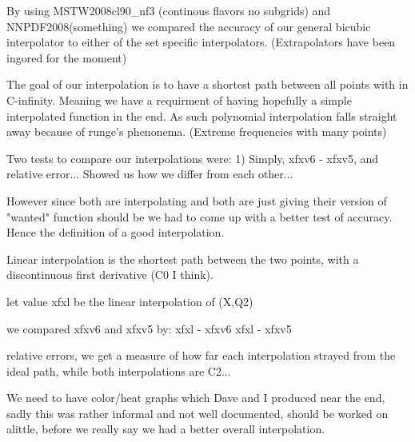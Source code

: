 By using MSTW2008cl90_nf3 (continous flavors no subgrids) and NNPDF2008(something)
we compared the accuracy of our general bicubic interpolator to either 
of the set specific interpolators. (Extrapolators have been ingored 
for the moment)

The goal of our interpolation is to have a shortest path between all 
points with in C-infinity. Meaning we have a requirment of having 
hopefully a simple interpolated function in the end. As such polynomial 
interpolation falls straight away because of runge's phenonema. 
(Extreme frequencies with many points)

Two tests to compare our interpolations were:
1) Simply, xfxv6 - xfxv5, and relative error... Showed us how we 
differ from each other...

However since both are interpolating and both are just giving their 
version of "wanted" function should be we had to come up with a better 
test of accuracy. Hence the definition of a good interpolation.

Linear interpolation is the shortest path between the two points, 
with a discontinuous first derivative (C0 I think). 

let value xfxl be the linear interpolation of (X,Q2)

we compared xfxv6 and xfxv5 by:
xfxl - xfxv6
xfxl - xfxv5

relative errors, we get a measure of how far each interpolation strayed 
from the ideal path, while both interpolations are C2...

We need to have color/heat graphs which Dave and I produced near the 
end, sadly this was rather informal and not well documented, should be 
worked on alittle, before we really say we had a better overall 
interpolation.
